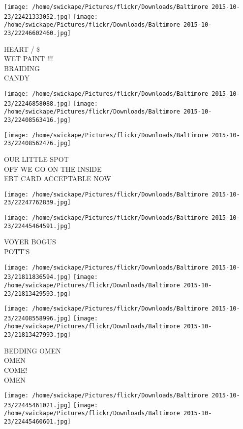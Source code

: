 \documentclass[10pt,letterpaper]{article}
\begin{document}
\texttt{[image: /home/swickape/Pictures/flickr/Downloads/Baltimore 2015-10-23/22421333052.jpg]}
\texttt{[image: /home/swickape/Pictures/flickr/Downloads/Baltimore 2015-10-23/22246602460.jpg]}

HEART / \$\\
WET PAINT !!!\\
BRAIDING\\
CANDY\\
\pagebreak

\texttt{[image: /home/swickape/Pictures/flickr/Downloads/Baltimore 2015-10-23/22246858088.jpg]}
\texttt{[image: /home/swickape/Pictures/flickr/Downloads/Baltimore 2015-10-23/22408563416.jpg]}

\texttt{[image: /home/swickape/Pictures/flickr/Downloads/Baltimore 2015-10-23/22408562476.jpg]}

OUR LITTLE SPOT\\
OFF WE GO ON THE INSIDE\\
EBT CARD ACCEPTABLE NOW\\
\pagebreak

\texttt{[image: /home/swickape/Pictures/flickr/Downloads/Baltimore 2015-10-23/22247762839.jpg]}

\vspace{0.25in}
\texttt{[image: /home/swickape/Pictures/flickr/Downloads/Baltimore 2015-10-23/22445464591.jpg]}

VOYER BOGUS\\
POTT'S\\
\pagebreak

\texttt{[image: /home/swickape/Pictures/flickr/Downloads/Baltimore 2015-10-23/21811836594.jpg]}
\texttt{[image: /home/swickape/Pictures/flickr/Downloads/Baltimore 2015-10-23/21813429593.jpg]}

\texttt{[image: /home/swickape/Pictures/flickr/Downloads/Baltimore 2015-10-23/22408558996.jpg]}
\texttt{[image: /home/swickape/Pictures/flickr/Downloads/Baltimore 2015-10-23/21813427993.jpg]}

BEDDING OMEN\\
OMEN\\
COME!\\
OMEN\\
\pagebreak

\texttt{[image: /home/swickape/Pictures/flickr/Downloads/Baltimore 2015-10-23/22445461021.jpg]}
\texttt{[image: /home/swickape/Pictures/flickr/Downloads/Baltimore 2015-10-23/22445460601.jpg]}
\end{document}
